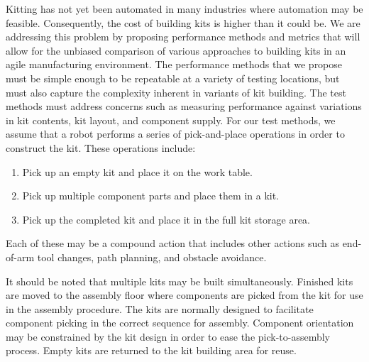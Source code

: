 Kitting has not yet been automated in many industries where
automation may be feasible. Consequently, the cost of building
kits is higher than it could be. We are addressing this problem
by proposing performance methods and metrics that will allow for
the unbiased comparison of various approaches to building kits
in an agile manufacturing environment. The performance methods
that we propose must be simple enough to be repeatable at a variety of
testing locations, but must also capture the complexity inherent
in variants of kit building. The test methods must address concerns such as
measuring performance against variations in kit contents, kit
layout, and component supply. For our test methods, we assume that
a robot performs a series of pick-and-place operations
in order to construct the kit. These operations include:
\begin{enumerate}
\item Pick up an empty kit and place it on the work table.
\item Pick up multiple component parts and place them in a kit.
\item Pick up the completed kit and place it in the full kit storage area.
\end{enumerate}
Each of these may be a compound action that includes
other actions such as end-of-arm tool changes, path planning,
and obstacle avoidance.

It should be noted that multiple kits may be built simultaneously.
Finished kits are moved to the assembly floor where components
are picked from the kit for use in the assembly procedure.
The kits are normally designed to facilitate component picking in the correct
sequence for assembly. Component orientation may be constrained
by the kit design in order to ease the pick-to-assembly process.
Empty kits are returned to the kit building area for reuse.
